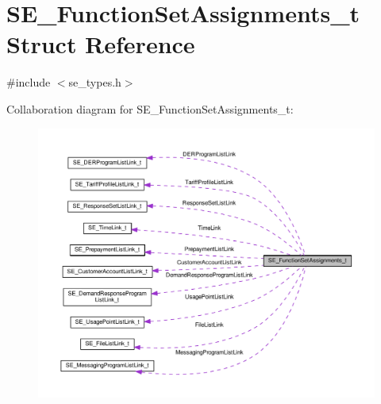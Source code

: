 \hypertarget{structSE__FunctionSetAssignments__t}{}\section{S\+E\+\_\+\+Function\+Set\+Assignments\+\_\+t Struct Reference}
\label{structSE__FunctionSetAssignments__t}


{\ttfamily \#include $<$se\+\_\+types.\+h$>$}



Collaboration diagram for S\+E\+\_\+\+Function\+Set\+Assignments\+\_\+t\+:\nopagebreak
\begin{figure}[H]
\begin{center}
\leavevmode
\includegraphics[width=350pt]{structSE__FunctionSetAssignments__t__coll__graph}
\end{center}
\end{figure}
